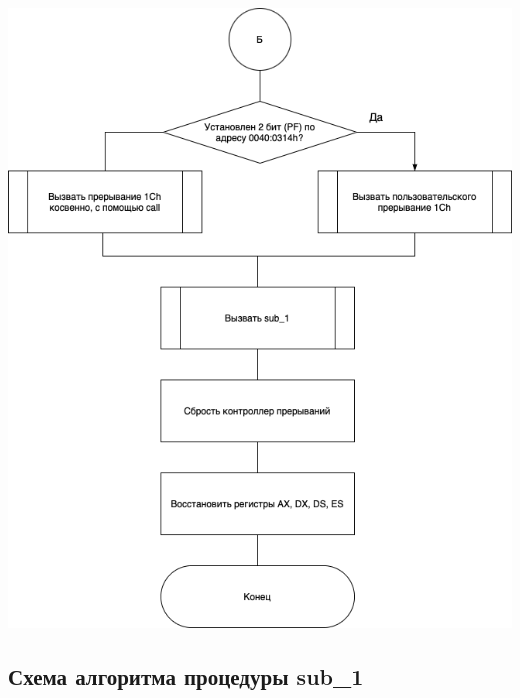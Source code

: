 \documentclass[a4paper,14pt]{article}
\begin{document}
\begin{flushright}
	\includegraphics[scale=0.75]{int8h_3.png}
\end{flushright}

\clearpage
\subsection{Схема алгоритма процедуры sub\_1}
\end{document}
